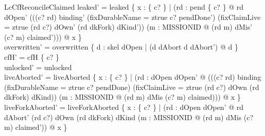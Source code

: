 \documentclass[a4paper,10pt,fleqn]{article}
\begin{document}
\begin{schema}{LcCfReconcileClaimed}
leaked' = leaked \cup \{ x : \{ c? \} | (\exists rd : pend \limg \{ c? \} \rimg @ rd \in dOpen' \land \lnot (((c? \mapsto rd) \in binding' \lor (fixDurableName = ztrue \land c? \in pendDone') \lor (fixClaimLive = ztrue \land (rd \mapsto c?) \in dOwn' \land (rd \mapsto dkFork) \in dKind')) \land (\exists m : MISSIONID @ (rd \mapsto m) \in dMis' \land (c? \mapsto m) \in claimed'))) @ x \} \\
overwritten' = overwritten \cup \{ d : skel \setminus dOpen | (d \in dAbort \iff d \notin dAbort') @ d \} \\
cfH' = cfH \setminus \{ c? \} \\
unlocked' = unlocked \\
liveAborted' = liveAborted \cup \{ x : \{ c? \} | (\exists rd : dOpen \setminus dOpen' @ (((c? \mapsto rd) \in binding \lor (fixDurableName = ztrue \land c? \in pendDone) \lor (fixClaimLive = ztrue \land (rd \mapsto c?) \in dOwn \land (rd \mapsto dkFork) \in dKind)) \land (\exists m : MISSIONID @ (rd \mapsto m) \in dMis \land (c? \mapsto m) \in claimed))) @ x \} \\
liveForkAborted' = liveForkAborted \cup \{ x : \{ c? \} | (\exists rd : dOpen \setminus dOpen' @ rd \in dAbort' \land (rd \mapsto c?) \in dOwn \land (rd \mapsto dkFork) \in dKind \land (\exists m : MISSIONID @ (rd \mapsto m) \in dMis \land (c? \mapsto m) \in claimed')) @ x \}
\end{schema}
\end{document}
